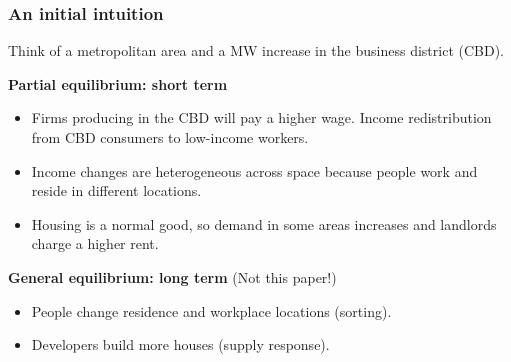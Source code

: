 \documentclass[aspectratio=169, t]{beamer}
\begin{document}
\begin{frame}
	\frametitle{An initial intuition}
    
    \vspace{3mm}
    
	Think of a metropolitan area and a MW increase in the business district (CBD). 
	
	\vspace{3mm}
	
    \textbf{Partial equilibrium: short term}
	\begin{itemize}
		\vspace{.5mm} \item Firms producing in the CBD will pay a higher wage. Income 
		redistribution from CBD consumers to low-income workers.
		\vspace{.5mm} \item Income changes are heterogeneous across space because people work 
		and reside in different locations.
		\vspace{.5mm} \item Housing is a normal good, so demand in some areas increases 
		and landlords charge a higher rent.
	\end{itemize}

	\pause
	\vspace{3mm}
	\textbf{General equilibrium: long term} (Not this paper!)
	\begin{itemize}
	\vspace{.5mm} \item People change residence and workplace locations (sorting).
	\vspace{.5mm} \item Developers build more houses (supply response).
\end{itemize}
\end{frame}
\end{document}

